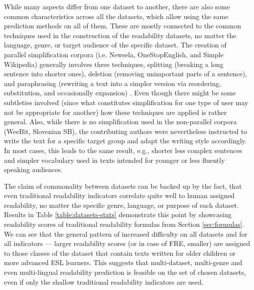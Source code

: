 \documentclass{clv3}
\begin{document}
While many aspects differ from one dataset to another, there are also some common characteristics across all the datasets, which allow using the same prediction methods on all of them. These are mostly connected to the common techniques used in the construction of the readability datasets, no matter the language, genre, or target audience of the specific dataset. The creation of parallel simplification corpora (i.e. Newsela, OneStopEnglish, and Simple Wikipedia) generally involves three techniques, splitting (breaking a long sentence into shorter ones), deletion (removing unimportant parts of a sentence), and paraphrasing (rewriting a text into a simpler version via reordering, substitution, and occasionally expansion) \citep{feng2008text}. Even though there might be some subtleties involved (since what constitutes simplification for one type of user may not be appropriate for another) how these techniques are applied is rather general. Also, while there is no simplification used in the non-parallel corpora (WeeBit, Slovenian SB), the contributing authors were nevertheless instructed to write the text for a specific target group and adapt the writing style accordingly. In most cases, this leads to the same result, e.g., shorter less complex sentences and simpler vocabulary used in texts intended for younger or less fluently speaking audiences. 

The claim of commonality between datasets can be backed up by the fact, that even traditional readability indicators correlate quite well to human assigned readability, no matter the specific genre, language, or purpose of each dataset. Results in Table \ref{table:datasets-stats} demonstrate this point by showcasing readability scores of traditional readability formulas from Section \ref{sec:formulas}. We can see that the general pattern of increased difficulty on all datasets and for all indicators --- larger readability scores (or in case of FRE, smaller) are assigned to those classes of the dataset that contain texts written for older children or more advanced ESL learners. This suggests that multi-dataset, multi-genre and even multi-lingual readability prediction is feasible on the set of chosen datasets, even if only the shallow traditional readability indicators are used. 
\end{document}
